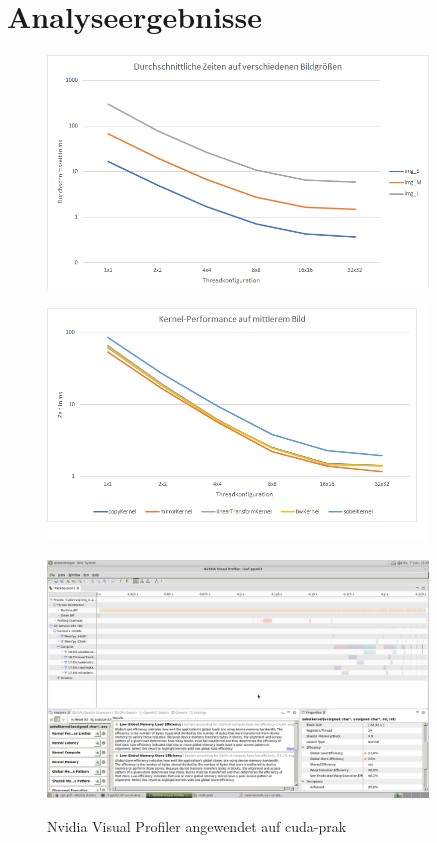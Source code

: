 \documentclass[12pt,a4paper]{scrartcl}
\begin{document}
\section{Analyseergebnisse}
\label{ergebnisse}
\begin{figure}[H]
    \caption{}
    \includegraphics[width=0.9\textwidth]{times(size).png}
    \label{fig:timesize}
\end{figure}

\begin{figure}[H]
    \caption{}
    \includegraphics[width=0.9\textwidth]{times(kernel).png}
    \label{fig:timekernel}
\end{figure}

\begin{figure}[H]
    \caption{Nvidia Visual Profiler angewendet auf cuda-prak}
    \includegraphics[width=0.9\textwidth]{Sobel_Char_Efficiency.png}
    \label{fig:sobelchar}
\end{figure}
\end{document}
